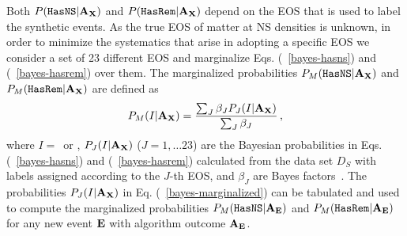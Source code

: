 Both $P({{\tt HasNS}}|{\bf A}_{\bf X})$ and $P({{\tt HasRem}}|{\bf A}_{\bf X})$ depend on the \ac{EOS} that is used to label the synthetic events. 
 As the true \ac{EOS} of matter at \ac{NS} densities is unknown, in order to minimize the systematics that arise in adopting a specific \ac{EOS} we consider a set of 23 different \ac{EOS} and marginalize Eqs. (~\ref{bayes-hasns}) and (~\ref{bayes-hasrem}) over them. The marginalized probabilities $P_M({{\tt HasNS}}|{\bf A}_{\bf X})$ and $P_M({{\tt HasRem}}|{\bf A}_{\bf X})$ are defined as
%
\begin{equation}
\begin{aligned}
P_M(I|{\bf A}_{\bf X})=\frac{\sum_J\beta_J P_J(I|{\bf A}_{\bf X})}{\sum_J\beta_J}\,,
\label{bayes-marginalized}
\end{aligned}
\end{equation}
%
where $I=$\hasns\ or \hasrem, $P_J(I|{\bf A}_{\bf X})$ ($J=1,\dots 23$) are the Bayesian probabilities in Eqs. (~\ref{bayes-hasns}) and (~\ref{bayes-hasrem}) calculated from the data set $D_S$ with labels assigned according to the $J$-th \ac{EOS}, and $\beta_J$ are Bayes factors~\cite{Ghosh:2021eqv}.   The probabilities $P_J(I|{\bf A}_{\bf X})$ in Eq. (~\ref{bayes-marginalized}) can be tabulated and used to compute the marginalized probabilities $P_M({{\tt HasNS}}|{\bf A}_{\bf E})$ and $P_M({{\tt HasRem}}|{\bf A}_{\bf E})$ for any new event $\bf E$ with algorithm outcome $\bf A_{E}$.
